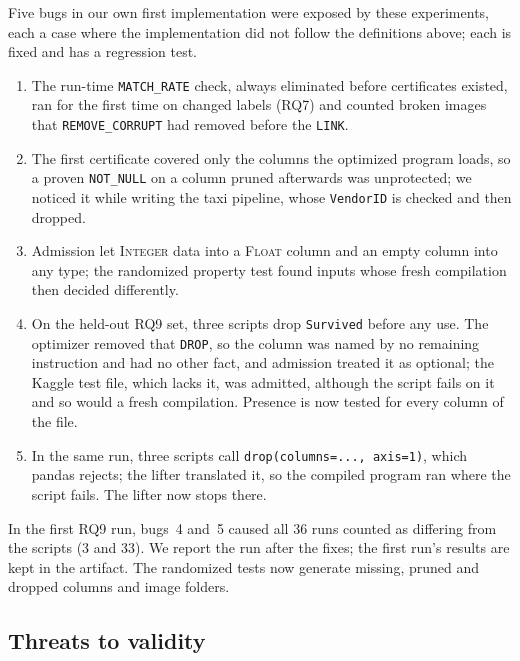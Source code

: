 \documentclass[conference]{IEEEtran}
\begin{document}
Five bugs in our own first implementation were exposed by these experiments, each a case where the
implementation did not follow the definitions above; each is fixed and has a regression test.
\begin{enumerate}
\item The run-time \texttt{MATCH\_RATE} check, always eliminated before certificates existed, ran for
the first time on changed labels (RQ7) and counted broken images that \texttt{REMOVE\_CORRUPT} had
removed before the \texttt{LINK}.
\item The first certificate covered only the columns the optimized program loads, so a proven
\texttt{NOT\_NULL} on a column pruned afterwards was unprotected; we noticed it while writing the taxi
pipeline, whose \texttt{VendorID} is checked and then dropped.
\item Admission let \textsc{Integer} data into a \textsc{Float} column and an empty column into any
type; the randomized property test found inputs whose fresh compilation then decided differently.
\item On the held-out RQ9 set, three scripts drop \texttt{Survived} before any use. The optimizer
removed that \texttt{DROP}, so the column was named by no remaining instruction and had no other
fact, and admission treated it as optional; the Kaggle test file, which lacks it, was admitted,
although the script fails on it and so would a fresh compilation. Presence is now tested for every
column of the file.
\item In the same run, three scripts call \texttt{drop(columns=..., axis=1)}, which pandas rejects;
the lifter translated it, so the compiled program ran where the script fails. The lifter now stops
there.
\end{enumerate}
In the first RQ9 run, bugs~4 and~5 caused all 36 runs counted as differing from the scripts (3 and
33). We report the run after the fixes; the first run's results are kept in the artifact. The
randomized tests now generate missing, pruned and dropped columns and image folders.

\subsection{Threats to validity}
\end{document}
